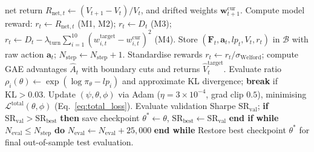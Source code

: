 \begin{algorithm}[H]
\begin{algorithmic}[1]
    \State \quad net return $R_{\text{net},t} \gets (V_{t+1}-V_t)/V_t$, and drifted weights $\mathbf{w}_{t+1}^{\text{cur}}$.
    \State Compute model reward: $r_t \gets R_{\text{net},t}$ (M1, M2); $r_t \gets D_t$ (M3); $r_t \gets D_t - \lambda_{\text{turn}}\sum_{i=1}^{10} (w_{i,t}^{\text{target}}-w_{i,t}^{\text{cur}})^2$ (M4).
    \State Store $(\mathbf{F}_t, \mathbf{a}_t, lp_t, V_t, r_t)$ in $\mathcal{B}$ with raw action $\mathbf{a}_t$; $N_{\text{step}} \gets N_{\text{step}} + 1$.
  \EndFor
  \State Standardise rewards $r_t \gets r_t / \sigma_{\text{Welford}}$; compute GAE advantages $\hat{A}_t$ with boundary cuts and returns $\hat{V}_t^{\text{target}}$.
      \State Evaluate ratio $\rho_i(\theta) \gets \exp(\log \pi_\theta - lp_i)$ and approximate KL divergence; \textbf{break} if $\text{KL} > 0.03$.
      \State Update $(\psi, \theta, \phi)$ via Adam ($\eta = 3 \times 10^{-4}$, grad clip $0.5$), minimising $\mathcal{L}^{\text{total}}(\theta, \phi)$ (Eq.~\eqref{eq:total_loss}).
    \EndFor
  \EndFor
    \State Evaluate validation Sharpe $\text{SR}_{\text{val}}$; \textbf{if} $\text{SR}_{\text{val}} > \text{SR}_{\text{best}}$ \textbf{then} save checkpoint $\theta^* \gets \theta$, $\text{SR}_{\text{best}} \gets \text{SR}_{\text{val}}$ \textbf{end if}
    \State \textbf{while} $N_{\text{eval}} \le N_{\text{step}}$ \textbf{do} $N_{\text{eval}} \gets N_{\text{eval}} + 25{,}000$ \textbf{end while}
  \EndIf
\EndWhile
\State Restore best checkpoint $\theta^*$ for final out-of-sample test evaluation.
\end{algorithmic}
\end{algorithm}
